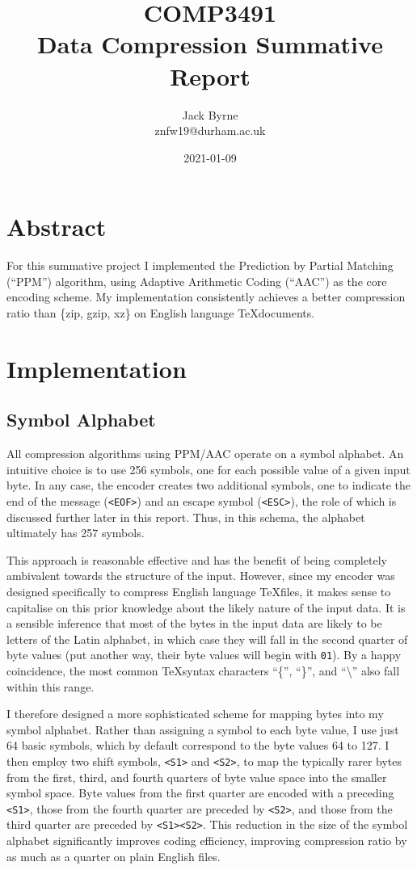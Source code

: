 \documentclass[11pt]{article}
\title{COMP3491 \\ Data Compression Summative Report}
\date{2021-01-09}
\author{Jack Byrne \\ znfw19@durham.ac.uk}
\newcommand{\code}[1]{\texttt{#1}}
\begin{document}
\maketitle

\section{Abstract}

For this summative project I implemented the Prediction by Partial Matching (\enquote{PPM}) algorithm, using Adaptive Arithmetic Coding (\enquote{AAC}) as the core encoding scheme. My implementation consistently achieves a better compression ratio than \{zip, gzip, xz\} on English language \TeX  \thinspace documents.

\section{Implementation}

\subsection{Symbol Alphabet}

All compression algorithms using PPM/AAC operate on a symbol alphabet. An intuitive choice is to use 256 symbols, one for each possible value of a given input byte. In any case, the encoder creates two additional symbols, one to indicate the end of the message (\code{<EOF>}) and an escape symbol (\code{<ESC>}), the role of which is discussed further later in this report. Thus, in this schema, the alphabet ultimately has 257 symbols.

This approach is reasonable effective and has the benefit of being completely ambivalent towards the structure of the input. However, since my encoder was designed specifically to compress English language \TeX \thinspace files, it makes sense to capitalise on this prior knowledge about the likely nature of the input data. It is a sensible inference that most of the bytes in the input data are likely to be letters of the Latin alphabet, in which case they will fall in the second quarter of byte values (put another way, their byte values will begin with \code{01}). By a happy coincidence, the most common \TeX \thinspace syntax characters \enquote{\{}, \enquote{\}}, and \enquote{\textbackslash} also fall within this range.

I therefore designed a more sophisticated scheme for mapping bytes into my symbol alphabet. Rather than assigning a symbol to each byte value, I use just 64 basic symbols, which by default correspond to the byte values 64 to 127. I then employ two shift symbols, \code{<S1>} and \code{<S2>}, to map the typically rarer bytes from the first, third, and fourth quarters of byte value space into the smaller symbol space. Byte values from the first quarter are encoded with a preceding \code{<S1>}, those from the fourth quarter are preceded by \code{<S2>}, and those from the third quarter are preceded by \code{<S1><S2>}. This reduction in the size of the symbol alphabet significantly improves coding efficiency, improving compression ratio by as much as a quarter on plain English files.
\end{document}
